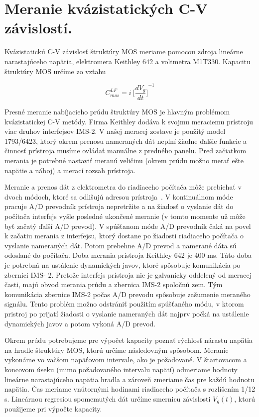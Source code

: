 \section{Meranie kvázistatických C-V závislostí.}\label{sec:5.2}

Kvázistatickú C-V závislosť štruktúry MOS meriame pomocou zdroja
lineárne narastajúceho napätia, elektromera Keithley 642 a voltmetra
M1T330. Kapacitu štruktúry MOS určíme zo vzťahu

\begin{equation}\label{eq:5.1}
  C_{mos}^{LF} = i\ {\bigg[\frac{dV_{g}}{dt}\bigg]}^{-1}
\end{equation}

Presné meranie nabíjacieho prúdu štruktúry MOS je hlavným problémom
kvázistatickej C-V metódy. Firma Keithley dodáva k svojmu meraciemu
prístroju viac druhov interfejsov IMS-2. V našej meracej zostave je
použitý model 1793/6423, ktorý okrem prenosu nameraných dát neplní
žiadne ďalšie funkcie a činnosť prístroja musíme ovládať manuálne z
predného panelu.  Pred začiatkom merania je potrebné nastaviť meranú
veličinu (okrem prúdu možno merať ešte napätie a náboj) a merací
rozsah prístroja.

Meranie a prenos dát z elektrometra do riadiaceho počítača môže
prebiehať v dvoch módoch, ktoré sa odlišujú adresou
prístroja~\cite{5.3}. V kontinuálnom móde pracuje A/D prevodník
prístroja nepretržite a na žiadosť o vyslanie dát do počítača
interfejs vyšle posledné ukončené meranie (v tomto momente už môže byť
začatý ďalší A/D prevod). V spúšťanom móde A/D prevodník čaká na povel
k začatiu merania z interfejsu, ktorý dostane po žiadosti riadiaceho
počítača o vyslanie nameraných dát. Potom prebehne A/D prevod a
namerané dáta sú odoslané do počítača. Doba merania prístroja Keithley
642 je 400 ms. Táto doba je potrebná na ustálenie dynamických javov,
ktoré spôsobuje komunikácia po zbernici IMS- 2. Pretože interfejs
prístroja nie je galvanicky oddelený od meracej časti, majú obvod
merania prúdu a zbernica IMS-2 spoločnú zem. Tým komunikácia zbernice
IMS-2 počas A/D prevodu spôsobuje zašumenie meraného signálu.  Tento
problém možno odstrániť použitím spúšťaného módu, v ktorom pristroj po
prijatí žiadosti o vyslanie nameraných dát najprv počká na ustálenie
dynamických javov a potom vykoná A/D prevod.

Okrem prúdu potrebujeme pre výpočet kapacity poznať rýchlosť nárastu
napätia na hradle štruktúry MOS, ktorú určíme následovným spôsobom.
Meranie vykonáme vo vačšom napäťovom intervale, ako je požadované. V
štartovacom a koncovom úseku (mimo požadovaného intervalu napätí)
odmeriame hodnoty lineárne narastajúceho napätia hradla a zároveň
zmeriame čas pre každú hodnotu napätia. Čas meriame vnútornými
hodinami riadiaceho počítača s rozlíšením 1/12 s. Lineárnou regresiou
spomemutých dát určíme smernicu závislosti $V_{g}(t)$, ktorú použijeme
pri výpočte kapacity.


